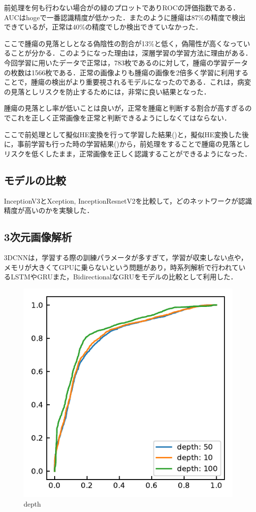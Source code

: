前処理を何も行わない場合がの緑のプロットでありROCの評価指数である．AUCはhogeで一番認識精度が低かった．またのように腫瘍は87\%の精度で検出できているが，正常は40\%の精度でしか検出できていなかった．

ここで腫瘍の見落としとなる偽陰性の割合が13\%と低く，偽陽性が高くなっていることが分かる．このようになった理由は，深層学習の学習方法に理由がある．今回学習に用いたデータで正常は，783枚であるのに対して，腫瘍の学習データの枚数は1566枚である．正常の画像よりも腫瘍の画像を2倍多く学習に利用することで，腫瘍の検出がより重要視されるモデルになったのである．これは，病変の見落としリスクを防止するためには，非常に良い結果となった．

腫瘍の見落とし率が低いことは良いが，正常を腫瘍と判断する割合が高すぎるのでこれを正しく正常画像を正常と判断できるようにしなくてはならない．

ここで前処理として擬似HE変換を行って学習した結果()と，擬似HE変換した後に，事前学習も行った時の学習結果()から，前処理をすることで腫瘍の見落としリスクを低くしたまま，正常画像を正しく認識することができるようになった．

\subsection*{モデルの比較}
InceptionV3とXception, InceptionResnetV2を比較して，どのネットワークが認識精度が高いのかを実験した．

\subsection{3次元画像解析}
3DCNNは，学習する際の訓練パラメータが多すぎて，学習が収束しない点や，メモリが大きくてGPUに乗らないという問題があり，時系列解析で行われているLSTMやGRUまた，BidirectionalなGRUをモデルの比較として利用した．

\begin{figure}
	\centering
	\includegraphics[width=0.7\linewidth]{fig/chapter4/3d/roc/depth_all.pdf}
	\caption{depth}
	\label{fig:depthall}
\end{figure}

